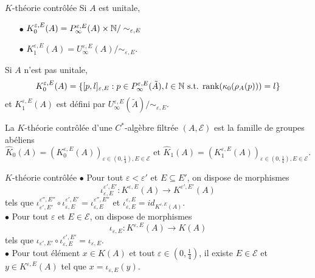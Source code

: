 \begin{frame}{$K$-théorie contrôlée}
Si $A$ est unitale,
\begin{itemize}
\item[$\bullet$] $K_0^{\varepsilon,E}(A) = P^{\varepsilon, E}_\infty(A)\times \mathbb N / \sim_{\varepsilon,E}$ 
\item[$\bullet$] $K_1^{\varepsilon,E}(A) = U^{\varepsilon, E}_\infty(A) / \sim_{\varepsilon,E}$.
\end{itemize}

Si $A$ n'est pas unitale,  
\[K_0^{\varepsilon,E}(A) = \{[p,l]_{\varepsilon,E} : p\in P^{\varepsilon,E}_\infty (\tilde A), l\in \mathbb N \text{ s.t. rank}(\kappa_0(\rho_A(p)))=l \}\]
et $K_1^{\varepsilon,E}(A)$ est défini par $U_\infty^{\varepsilon,E}(\tilde A)/ \sim_{\varepsilon,E}$.\\

\begin{definitionfr}
La $K$-théorie contrôlée d'une $C^*$-algèbre filtrée $(A,\mathcal E)$ est la famille de groupes abéliens 
\[\hat K_0(A) = (K_0^{\varepsilon,E}(A))_{\varepsilon\in (0,\frac{1}{4}),E\in\mathcal E} \text{ et } \hat K_1(A) = (K_1^{\varepsilon,E}(A))_{\varepsilon\in (0,\frac{1}{4}),E\in\mathcal E}.\]
\end{definitionfr}
\end{frame}

\begin{frame}{$K$-théorie contrôlée}
$\bullet$ Pour tout $\varepsilon <\varepsilon'$ et $E\subseteq E'$, on dispose de morphismes 
\[\iota_{\varepsilon,E}^{\varepsilon',E'} : K^{\varepsilon,E}(A)\rightarrow K^{\varepsilon',E'}(A) \]
tels que $\iota_{\varepsilon',E'}^{\varepsilon'',E''}\circ \iota_{\varepsilon,E}^{\varepsilon',E'} = \iota_{\varepsilon,E}^{\varepsilon'',E''}$ et $\iota_{\varepsilon,E}^{\varepsilon,E}= id_{K^{\varepsilon,E}(A)}$.\\
\vspace{0.3 cm}
$\bullet$ Pour tout $\varepsilon $ et $E\in\mathcal E$, on dispose de morphismes 
\[\iota_{\varepsilon,E} : K^{\varepsilon,E}(A)\rightarrow K(A) \]
tels que $\iota_{\varepsilon',E'}\circ \iota_{\varepsilon,E}^{\varepsilon',E'} = \iota_{\varepsilon,E}$.\\
\vspace{0.3 cm}
$\bullet$ Pour tout élément $x\in K(A)$ et tout $\varepsilon\in (0,\frac{1}{4})$, il existe $E\in\mathcal E$ et $y\in K^{\varepsilon,E}(A)$ tel que $x=\iota_{\varepsilon,E}(y)$.
\end{frame}

